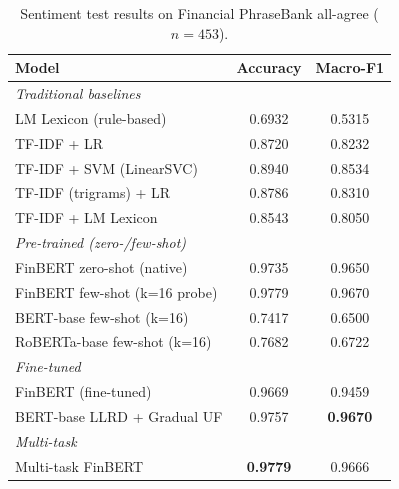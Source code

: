 \documentclass[conference, 10pt, twocolumn]{IEEEtran}
\begin{document}
\begin{table}[h]
\centering
\caption{Sentiment test results on Financial PhraseBank all-agree
($n=453$).}
\label{tab:sentiment}
\small
\begin{tabular}{lcc}
\toprule
\textbf{Model} & \textbf{Accuracy} & \textbf{Macro-F1} \\
\midrule
\multicolumn{3}{l}{\emph{Traditional baselines}} \\
LM Lexicon (rule-based)         & 0.6932 & 0.5315 \\
TF-IDF + LR                     & 0.8720 & 0.8232 \\
TF-IDF + SVM (LinearSVC)        & 0.8940 & 0.8534 \\
TF-IDF (trigrams) + LR          & 0.8786 & 0.8310 \\
TF-IDF + LM Lexicon             & 0.8543 & 0.8050 \\
\midrule
\multicolumn{3}{l}{\emph{Pre-trained (zero-/few-shot)}} \\
FinBERT zero-shot (native)      & 0.9735 & 0.9650 \\
FinBERT few-shot (k=16 probe)   & 0.9779 & 0.9670 \\
BERT-base few-shot (k=16)       & 0.7417 & 0.6500 \\
RoBERTa-base few-shot (k=16)    & 0.7682 & 0.6722 \\
\midrule
\multicolumn{3}{l}{\emph{Fine-tuned}} \\
FinBERT (fine-tuned)            & 0.9669 & 0.9459 \\
BERT-base LLRD + Gradual UF     & 0.9757 & \textbf{0.9670} \\
\midrule
\multicolumn{3}{l}{\emph{Multi-task}} \\
Multi-task FinBERT              & \textbf{0.9779} & 0.9666 \\
\bottomrule
\end{tabular}
\end{table}
\end{document}
